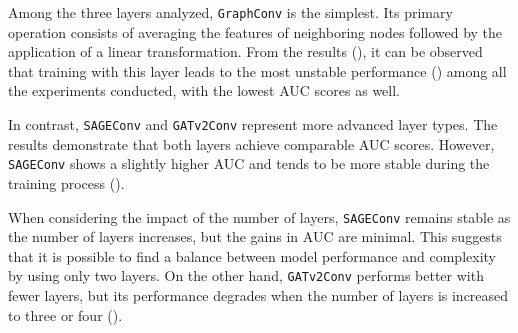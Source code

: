 \documentclass[11pt]{article}
\begin{document}
Among the three layers analyzed, \texttt{GraphConv} is the simplest. 
%
Its primary operation consists of averaging the features of neighboring nodes followed by the application of a linear transformation. 
%
From the results (), it can be observed that training with this layer leads to the most unstable performance () among all 
%
the experiments conducted, with the lowest AUC scores as well.

In contrast, \texttt{SAGEConv} and \texttt{GATv2Conv} represent more advanced layer types. 
%
The results demonstrate that both layers achieve comparable AUC scores. 
%
However, \texttt{SAGEConv} shows a slightly higher AUC and tends to be more stable during the training process ().

When considering the impact of the number of layers, \texttt{SAGEConv} remains stable as the number of 
%
layers increases, but the gains in AUC are minimal. 
%
This suggests that it is possible to find a balance between model performance and complexity by using only two layers. 
%
On the other hand, \texttt{GATv2Conv} performs better with fewer layers, but its performance degrades when the number 
%
of layers is increased to three or four ().
\end{document}
